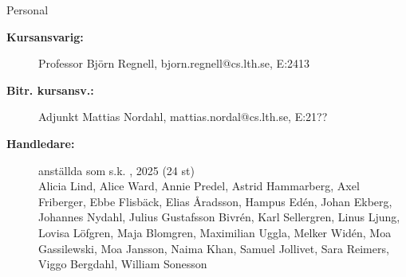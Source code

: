 \ifkompendium\else
\begin{SlideExtra}{Personal \CurrentYear}\SlideFontSmall
\begin{description}
\item [\bfseries Kursansvarig:] Professor Björn Regnell, bjorn.regnell@cs.lth.se, E:2413
\item [\bfseries Bitr. kursansv.:] Adjunkt Mattias Nordahl, mattias.nordal@cs.lth.se, E:21??
\item [\bfseries Handledare:]  anställda som s.k. , %
2025 (24 st) \\
Alicia Lind,
Alice Ward,
Annie Predel,
Astrid Hammarberg,
Axel Friberger,
Ebbe Flisbäck,
Elias Åradsson,
Hampus Edén,
Johan Ekberg,
Johannes Nydahl,
Julius Gustafsson Bivrén,
Karl Sellergren,
Linus Ljung,
Lovisa Löfgren,
Maja Blomgren,
Maximilian Uggla,
Melker Widén,
Moa Gassilewski,
Moa Jansson,
Naima Khan,
Samuel Jollivet,
Sara Reimers,
Viggo Bergdahl,
William Sonesson



\end{description}
\end{SlideExtra}
